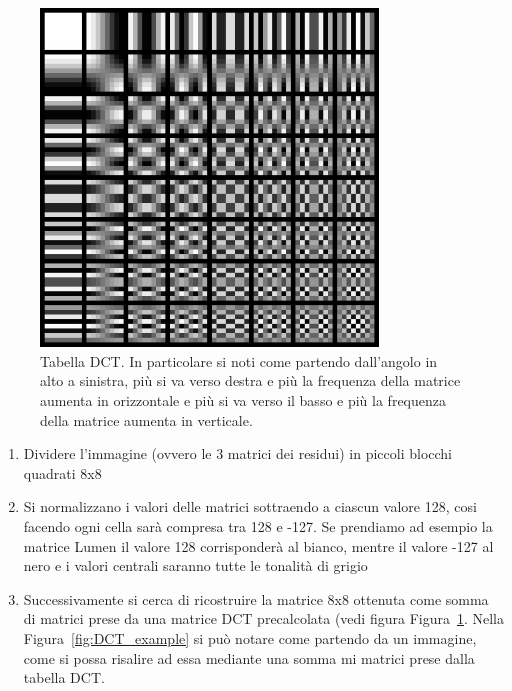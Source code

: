 \documentclass[a4paper,12pt, oneside]{article}
\begin{document}
\begin{figure}[h]
    \centering
    \includegraphics[width=0.8\textwidth]{images/DCT-table.png}
    \caption{Tabella DCT. In particolare si noti come partendo dall'angolo in alto a sinistra,
    più si va verso destra e più la frequenza della matrice aumenta in orizzontale e più si va
    verso il basso e più la frequenza della matrice aumenta in verticale.}
    \label{fig:DCT_table}
\end{figure}

\begin{enumerate}
    \item Dividere l'immagine (ovvero le 3 matrici dei residui) in piccoli blocchi quadrati 8x8
    \item Si normalizzano i valori delle matrici sottraendo a ciascun valore 128, cosi facendo
    ogni cella sarà compresa tra 128 e -127. Se prendiamo ad esempio la matrice Lumen il valore
    128 corrisponderà al bianco, mentre il valore -127 al nero e i valori centrali saranno tutte
    le tonalità di grigio
    \item Successivamente si cerca di ricostruire la matrice 8x8 ottenuta come somma di matrici
    prese da una matrice DCT precalcolata (vedi figura Figura~\ref{fig:DCT_table}. Nella 
    Figura~\ref{fig:DCT_example} si può notare come partendo da un immagine, come si possa
    risalire ad essa mediante una somma mi matrici prese dalla tabella DCT.
\end{enumerate}
\end{document}
